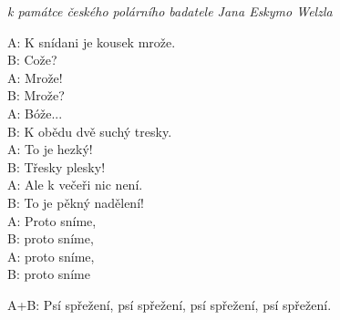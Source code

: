 \nv\emph{k památce českého polárního badatele Jana Eskymo Welzla}


\nv
A: K snídani je kousek mrože.\\
B: Cože?\\
A: Mrože!\\
B: Mrože?\\
A: Bóže...\\
B: K obědu dvě suchý tresky.\\
A: To je hezký!\\
B: Třesky plesky!\\
A: Ale k večeři nic není.\\
B: To je pěkný nadělení!\\
A: Proto sníme,\\
B: proto sníme,\\
A: proto sníme,\\
B: proto sníme

\sm A+B: Psí spřežení, psí spřežení, psí spřežení, psí spřežení.

\vspace{5mm}
\newpage
